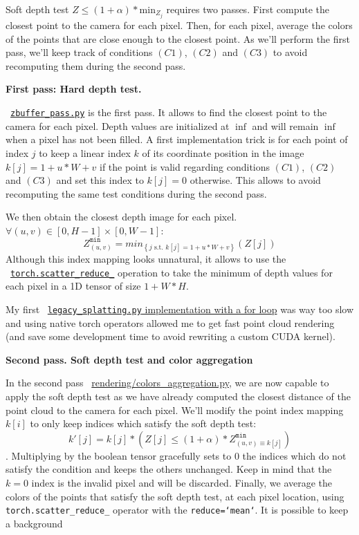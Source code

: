 Soft depth test $Z \leq (1 + \alpha) * \textrm{min}_{Z_{j}}$ requires two passes. First compute the closest point to the camera for each pixel. Then, for each pixel, average the colors of the points that are close enough to the closest point. As we'll perform the first pass, we'll keep track of conditions $(C1)$, $(C2)$ and $(C3)$ to avoid recomputing them during the second pass.

\noindent \textbf{First pass: Hard depth test.}

\noindent ~\href{https://github.com/balthazarneveu/per-pixel-point-rendering/blob/main/src/pixr/rendering/zbuffer\_pass.py#L5}{\texttt{zbuffer\_pass.py}} is the first pass. It allows to find the closest point to the camera for each pixel. Depth values are initialized at $\inf$ and will remain $\inf$ when a pixel has not been filled. A first implementation trick is for each point of index $j$ to keep a linear index $k$ of its coordinate position in the image $k[j] = 1+ u*W+v$ if the point is valid regarding conditions $(C1)$, $(C2)$ and $(C3)$ and set this index to $k[j]=0$ otherwise. This allows to avoid recomputing the same test conditions during the second pass.

We then obtain the closest depth image for each pixel. $\forall (u,v) \in \left[0, H-1\right] \times \left[0, W-1\right]$:
$$Z^{\texttt{min}}_{(u,v)} = min_{\left\{j  \text{ s.t. } k[j]=1+u*W+v\right\}} \left(Z[j]\right)$$
\noindent Although this index mapping looks unnatural, it allows to use the ~\href{https://pytorch.org/docs/stable/generated/torch.Tensor.scatter\_reduce\_.html#torch.Tensor.scatter\_reduce\_}{\texttt{torch.scatter\_reduce\_}} operation to take the minimum of depth values for each pixel in a 1D tensor of size $1+W*H$.

My first ~\href{https://github.com/balthazarneveu/per-pixel-point-rendering/blob/main/src/pixr/rendering/legacy\_splatting.py}{\texttt{legacy\_splatting.py} implementation with a for loop} was way too slow and using native torch operators allowed me to get fast point cloud rendering (and save some development time to avoid rewriting a custom CUDA kernel).

\noindent \textbf{Second pass. Soft depth test and color aggregation}

In the second pass  ~\href{https://github.com/balthazarneveu/per-pixel-point-rendering/blob/main/src/pixr/rendering/colors\_aggregation.py}{rendering/colors\_aggregation.py}, we are now capable to apply the soft depth test as we have already computed the closest distance of the point cloud to the camera for each pixel. We'll modify the point index mapping $k[i]$ to only keep indices which satisfy the soft depth test: 
$$ k'[j] = k[j] * \left(Z[j] \leq (1+\alpha) *Z^{\texttt{min}}_{(u,v) \equiv k[j]}\right)$$.
Multiplying by the boolean tensor gracefully sets to 0 the indices which do not satisfy the condition and keeps the others unchanged. Keep in mind that the $k=0$ index is the invalid pixel and will be discarded.
Finally, we average the colors of the points that satisfy the soft depth test, at each pixel location, using \texttt{torch.scatter\_reduce\_} operator with the \texttt{reduce=`mean`}. It is possible to keep a background

